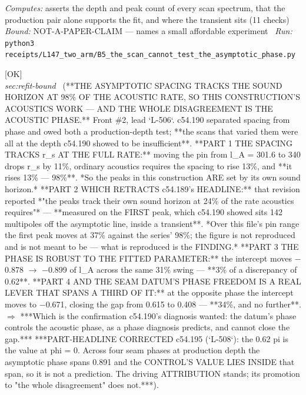 \begin{description}
\emph{Computes:} asserts the depth and peak count of every scan spectrum, that the production pair alone supports the fit, and where the transient sits (11 checks)
 \emph{Bound:} NOT-A-PAPER-CLAIM --- names a small affordable experiment
\ \emph{Run:} \texttt{python3 receipts/L147\_two\_arm/B5\_the\_scan\_cannot\_test\_the\_asymptotic\_phase.py}
\item[\label{rcpt:P15_the_acoustics_work_and_the_phase_is_the_whole_disagreement}\texttt{P15\_the\_acoustics\_work\_and\_the\_phase\_is\_the\_whole\_disagreement}]\hfill\textsf{[OK]}\\
\textit{sec:refit-bound} \ (**THE ASYMPTOTIC SPACING TRACKS THE SOUND HORIZON AT 98\% OF THE ACOUSTIC RATE, SO THIS CONSTRUCTION'S ACOUSTICS WORK --- AND THE WHOLE DISAGREEMENT IS THE ACOUSTIC PHASE.** Front \#2, lead `L-506`. c54.190 separated spacing from phase and owed both a production-depth test; **the scans that varied them were all at the depth c54.190 showed to be insufficient**. **PART 1 THE SPACING TRACKS r\_s AT THE FULL RATE:** moving the pin from l\_A = 301.6 to 340 drops r\_s by 11\%, ordinary acoustics requires the spacing to rise 13\%, and **it rises 13\% --- 98\%**. *So the peaks in this construction ARE set by its own sound horizon.*  **PART 2 WHICH RETRACTS c54.189's HEADLINE:** that revision reported *"the peaks track their own sound horizon at 24\% of the rate acoustics requires"* --- **measured on the FIRST peak, which c54.190 showed sits 142 multipoles off the asymptotic line, inside a transient**. *Over this file's pin range the first peak moves at 37\% against the series' 98\%; the figure is not reproduced and is not meant to be --- what is reproduced is the FINDING.* **PART 3 THE PHASE IS ROBUST TO THE FITTED PARAMETER:** the intercept moves \ensuremath{-}0.878 \ensuremath{\to} \ensuremath{-}0.899 of l\_A across the same 31\% swing --- **3\% of a discrepancy of 0.62**. **PART 4 AND THE SEAM DATUM'S PHASE FREEDOM IS A REAL LEVER THAT SPANS A THIRD OF IT:** at the opposite phase the intercept moves to \ensuremath{-}0.671, closing the gap from 0.615 to 0.408 --- **34\%, and no further**. \ensuremath{\Rightarrow} ***Which is the confirmation c54.190's diagnosis wanted: the datum's phase controls the acoustic phase, as a phase diagnosis predicts, and cannot close the gap.***  ***PART-HEADLINE CORRECTED c54.195 (`L-508`): the 0.62 pi is the value at phi = 0. Across four seam phases at production depth the asymptotic phase spans 0.891 and the CONTROL'S VALUE LIES INSIDE that span, so it is not a prediction. The driving ATTRIBUTION stands; its promotion to "the whole disagreement" does not.***). 

\end{description}
